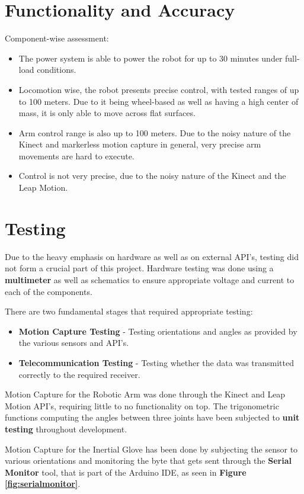 \documentclass[12p,a4paper]{report}
\begin{document}
\section{Functionality and Accuracy}
Component-wise assessment:
\begin{itemize}
\item The power system is able to power the robot for up to 30 minutes under full-load conditions.
\item Locomotion wise, the robot presents precise control, with tested ranges of up to 100 meters. Due to it being wheel-based as well as having a high center of mass, it is only able to move across flat surfaces.
\item Arm control range is also up to 100 meters. Due to the noisy nature of the Kinect and markerless motion capture in general, very precise arm movements are hard to execute.  
\item Control is not very precise, due to the noisy nature of the Kinect and the Leap Motion.
\end{itemize}

\section{Testing}
Due to the heavy emphasis on hardware as well as on external API's, testing did not form a crucial part of this project. Hardware testing was done using a \textbf{multimeter} as well as schematics to ensure appropriate voltage and current to each of the components. 

There are two fundamental stages that required appropriate testing:
\begin{itemize}
\item \textbf{Motion Capture Testing} - Testing orientations and angles as provided by the various sensors and API's.
\item \textbf{Telecommunication Testing} - Testing whether the data was transmitted correctly to the required receiver.
\end{itemize}

Motion Capture for the Robotic Arm was done through the Kinect and Leap Motion API's, requiring little to no functionality on top. The trigonometric functions computing the angles between three joints have been subjected to \textbf{unit testing} throughout development.

Motion Capture for the Inertial Glove has been done by subjecting the sensor to various orientations and monitoring the byte that gets sent through the \textbf{Serial Monitor} tool, that is part of the Arduino IDE, as seen in \textbf{Figure \ref{fig:serialmonitor}}.
\end{document}
